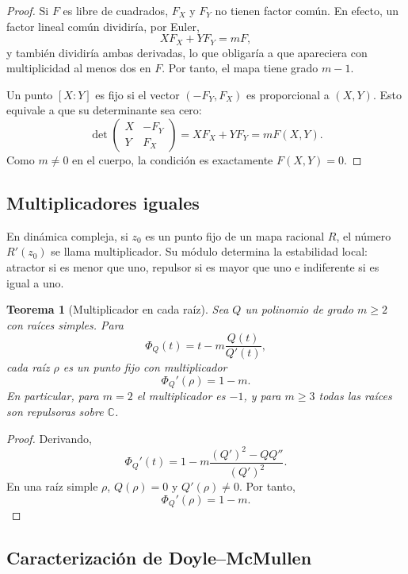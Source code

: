 \documentclass[11pt,oneside]{scrartcl}
\theoremstyle{plainblue}
\newtheorem{theorem}{Teorema}[section]
\theoremstyle{definitionblue}
\theoremstyle{remarkgray}
\newcommand{\CC}{\mathbb{C}}
\begin{document}
\begin{proof}
Si \(F\) es libre de cuadrados, \(F_X\) y \(F_Y\) no tienen factor común. En efecto,
un factor lineal común dividiría, por Euler,
\[
XF_X+YF_Y=mF,
\]
y también dividiría ambas derivadas, lo que obligaría a que apareciera con
multiplicidad al menos dos en \(F\). Por tanto, el mapa tiene grado \(m-1\).

Un punto \([X:Y]\) es fijo si el vector \((-F_Y,F_X)\) es proporcional a
\((X,Y)\). Esto equivale a que su determinante sea cero:
\[
\det\begin{pmatrix}X&-F_Y\\Y&F_X\end{pmatrix}
=XF_X+YF_Y=mF(X,Y).
\]
Como \(m\ne0\) en el cuerpo, la condición es exactamente \(F(X,Y)=0\).
\end{proof}

\subsection{Multiplicadores iguales}

En dinámica compleja, si \(z_0\) es un punto fijo de un mapa racional \(R\), el
número \(R'(z_0)\) se llama multiplicador. Su módulo determina la estabilidad local:
atractor si es menor que uno, repulsor si es mayor que uno e indiferente si es igual
a uno.

\begin{theorem}[Multiplicador en cada raíz]\label{thm:root-multiplier}
Sea \(Q\) un polinomio de grado \(m\ge2\) con raíces simples. Para
\[
\Phi_Q(t)=t-m\frac{Q(t)}{Q'(t)},
\]
cada raíz \(\rho\) es un punto fijo con multiplicador
\begin{equation}\label{eq:multiplier}
\boxed{\Phi_Q'(\rho)=1-m.}
\end{equation}
En particular, para \(m=2\) el multiplicador es \(-1\), y para \(m\ge3\) todas las
raíces son repulsoras sobre \(\CC\).
\end{theorem}

\begin{proof}
Derivando,
\[
\Phi_Q'(t)
=1-m\frac{(Q')^2-QQ''}{(Q')^2}.
\]
En una raíz simple \(\rho\), \(Q(\rho)=0\) y \(Q'(\rho)\ne0\). Por tanto,
\[
\Phi_Q'(\rho)=1-m.
\]
\end{proof}

\subsection{Caracterización de Doyle--McMullen}
\end{document}
